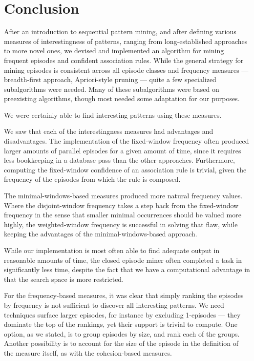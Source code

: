 \chapter{Conclusion}


After an introduction to sequential pattern mining, and after defining various measures of interestingness of patterns, ranging from long-established approaches to more novel ones, we devised and implemented an algorithm for mining frequent episodes and confident association rules. While the general strategy for mining episodes is consistent across all episode classes and frequency measures --- breadth-first approach, Apriori-style pruning --- quite a few specialized subalgorithms were needed. Many of these subalgorithms were based on preexisting algorithms, though most needed some adaptation for our purposes.


We were certainly able to find interesting patterns using these measures.

We saw that each of the interestingness measures had advantages and disadvantages. The implementation of the fixed-window frequency often produced larger amounts of parallel episodes for a given amount of time, since it requires less bookkeeping in a database pass than the other approaches. Furthermore, computing the fixed-window confidence of an association rule is trivial, given the frequency of the episodes from which the rule is composed.

The minimal-windows-based measures produced more natural frequency values. Where the disjoint-window frequency takes a step back from the fixed-window frequency in the sense that smaller minimal occurrences should be valued more highly, the weighted-window frequency is successful in solving that flaw, while keeping the advantages of the minimal-windows-based approach.


While our implementation is most often able to find adequate output in reasonable amounts of time, the closed episode miner often completed a task in significantly less time, despite the fact that we have a computational advantage in that the search space is more restricted.

For the frequency-based measures, it was clear that simply ranking the episodes by frequency is not sufficient to discover all interesting patterns. We need techniques surface larger episodes, for instance by excluding 1-episodes --- they dominate the top of the rankings, yet their support is trivial to compute. One option, as we stated, is to group episodes by size, and rank each of the groups. Another possibility is to account for the size of the episode in the definition of the measure itself, as with the cohesion-based measures.

